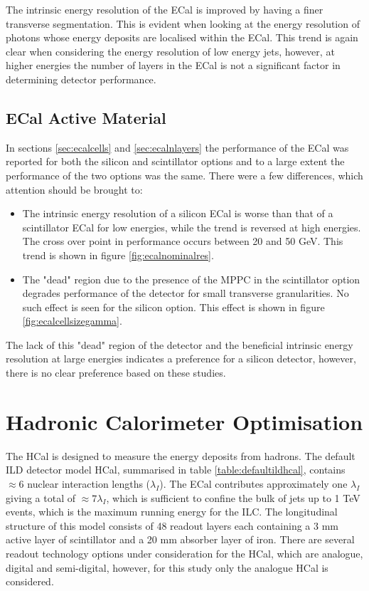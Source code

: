 The intrinsic energy resolution of the ECal is improved by having a finer transverse segmentation.  This is evident when looking at the energy resolution of photons whose energy deposits are localised within the ECal.  This trend is again clear when considering the energy resolution of low energy jets, however, at higher energies the number of layers in the ECal is not a significant factor in determining detector performance.

\subsection{ECal Active Material}
In sections \ref{sec:ecalcells} and \ref{sec:ecalnlayers} the performance of the ECal was reported for both the silicon and scintillator options and to a large extent the performance of the two options was the same.  There were a few differences, which attention should be brought to:

\begin{itemize}
\item The intrinsic energy resolution of a silicon ECal is worse than that of a scintillator ECal for low energies, while the trend is reversed at high energies.  The cross over point in performance occurs between 20 and 50 GeV.  This trend is shown in figure \ref{fig:ecalnominalres}.    
\item The "dead" region due to the presence of the MPPC in the scintillator option degrades performance of the detector for small transverse granularities.  No such effect is seen for the silicon option.  This effect is shown in figure \ref{fig:ecalcellsizegamma}.
\end{itemize}

The lack of this "dead" region of the detector and the beneficial intrinsic energy resolution at large energies indicates a preference for a silicon detector, however, there is no clear preference based on these studies.  


\section{Hadronic Calorimeter Optimisation}
The HCal is designed to measure the energy deposits from hadrons.  The default ILD detector model HCal, summarised in table \ref{table:defaultildhcal}, contains $\approx 6$ nuclear interaction lengths ($\lambda_{I}$).  The ECal contributes approximately one $\lambda_{I}$ giving a total of $\approx 7 \lambda_{I}$, which is sufficient to confine the bulk of jets up to 1 TeV events, which is the maximum running energy for the ILC.  The longitudinal structure of this model consists of 48 readout layers each containing a 3 mm active layer of scintillator and a 20 mm absorber layer of iron.  There are several readout technology options under consideration for the HCal, which are analogue, digital and semi-digital, however, for this study only the analogue HCal is considered.  


